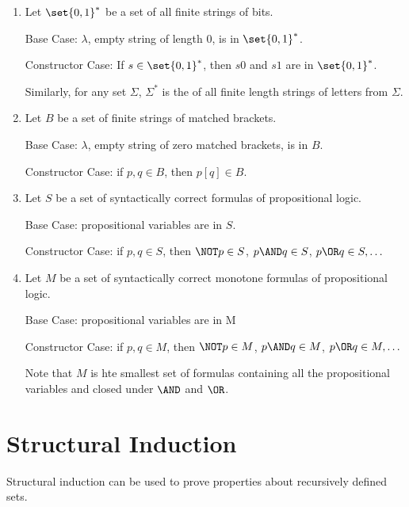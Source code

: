 \documentclass[11pt]{scrartcl}
\begin{document}
\begin{example}
  \hfill
  
\begin{enumerate}
\item\label{item:1} Let $\set{0, 1}^{*}$ be a set of all finite strings of bits.

  Base Case: $\lambda$, empty string of length 0, is in $\set{0, 1}^{*}$.

  Constructor Case: If $s\in\set{0, 1}^{*}$, then $s0$ and $s1$ are in $\set{0, 1}^{*}$.

  Similarly, for any set $\Sigma$, $\Sigma^{*}$ is the of all finite
  length strings of letters from $\Sigma$.
\item Let $B$ be a set of finite strings of matched brackets.

  Base Case: $\lambda$, empty string of zero matched brackets, is in $B$.

  Constructor Case: if $p, q\in B$, then $p[q] \in B$.
\item Let $S$ be a set of syntactically correct formulas of propositional logic.

  Base Case: propositional variables are in $S$.

  Constructor Case: if $p, q \in S$, then $\NOT p \in S$, $p \AND q \in S$, $p \OR q \in S, \dots$
\item Let $M$ be a set of syntactically correct monotone formulas of propositional logic.

  Base Case: propositional variables are in M

  Constructor Case: if $p, q \in M$, then $\NOT p \in M$, $p \AND q \in M$, $p \OR q \in M, \dots$
  
  Note that $M$ is hte smallest set of formulas containing all the propositional variables and closed under $\AND$ and $\OR$.
\end{enumerate}
\end{example}

\section{Structural Induction}
Structural induction can be used to prove properties about recursively defined sets.
\end{document}

